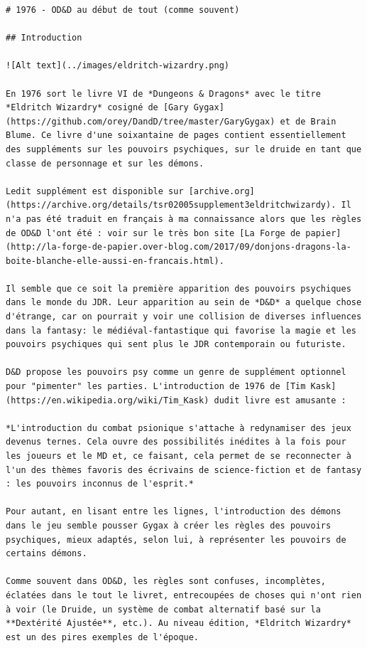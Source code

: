 \documentclass[11pt]{article}
\begin{document}
{\begin{verbatim}
# 1976 - OD&D au début de tout (comme souvent)

## Introduction

![Alt text](../images/eldritch-wizardry.png)

En 1976 sort le livre VI de *Dungeons & Dragons* avec le titre *Eldritch Wizardry* cosigné de [Gary Gygax](https://github.com/orey/DandD/tree/master/GaryGygax) et de Brain Blume. Ce livre d'une soixantaine de pages contient essentiellement des suppléments sur les pouvoirs psychiques, sur le druide en tant que classe de personnage et sur les démons.

Ledit supplément est disponible sur [archive.org](https://archive.org/details/tsr02005supplement3eldritchwizardy). Il n'a pas été traduit en français à ma connaissance alors que les règles de OD&D l'ont été : voir sur le très bon site [La Forge de papier](http://la-forge-de-papier.over-blog.com/2017/09/donjons-dragons-la-boite-blanche-elle-aussi-en-francais.html).

Il semble que ce soit la première apparition des pouvoirs psychiques dans le monde du JDR. Leur apparition au sein de *D&D* a quelque chose d'étrange, car on pourrait y voir une collision de diverses influences dans la fantasy: le médiéval-fantastique qui favorise la magie et les pouvoirs psychiques qui sent plus le JDR contemporain ou futuriste.

D&D propose les pouvoirs psy comme un genre de supplément optionnel pour "pimenter" les parties. L'introduction de 1976 de [Tim Kask](https://en.wikipedia.org/wiki/Tim_Kask) dudit livre est amusante :

*L'introduction du combat psionique s'attache à redynamiser des jeux devenus ternes. Cela ouvre des possibilités inédites à la fois pour les joueurs et le MD et, ce faisant, cela permet de se reconnecter à l'un des thèmes favoris des écrivains de science-fiction et de fantasy : les pouvoirs inconnus de l'esprit.*

Pour autant, en lisant entre les lignes, l'introduction des démons dans le jeu semble pousser Gygax à créer les règles des pouvoirs psychiques, mieux adaptés, selon lui, à représenter les pouvoirs de certains démons.

Comme souvent dans OD&D, les règles sont confuses, incomplètes, éclatées dans le tout le livret, entrecoupées de choses qui n'ont rien à voir (le Druide, un système de combat alternatif basé sur la **Dextérité Ajustée**, etc.). Au niveau édition, *Eldritch Wizardry* est un des pires exemples de l'époque.


\end{verbatim}}
\end{document}
